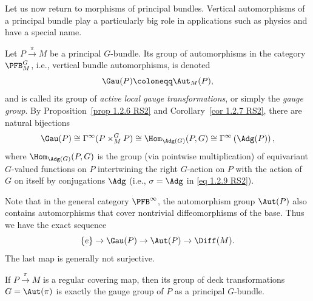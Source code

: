 \PRLsep

Let us now return to morphisms of principal bundles. Vertical automorphisms of a principal bundle play a particularly big role in applications such as physics and have a special name.

\begin{defn}
    Let $P\overset{\pi}{\to}M$ be a principal $G$-bundle. Its group of automorphisms in the category $\PFB^G_M$, i.e., vertical bundle automorphisms, is denoted 
    \[\Gau(P)\coloneqq \Aut_M(P),\]
    and is called its group of \emph{active local gauge transformations}, or simply the \emph{gauge group}. By Proposition~\ref{prop 1.2.6 RS2} and Corollary~\ref{cor 1.2.7 RS2}, there are natural bijections \[\Gau(P)\cong \Gamma^\infty(P\times^G_MP)\cong \Hom_{\Adg(G)}(P,G)\cong \Gamma^\infty\left(\Adg(P)\right),\]
    where $\Hom_{\Adg(G)}(P,G)$ is the group (via pointwise multiplication) of equivariant $G$-valued functions on $P$ intertwining the right $G$-action on $P$ with the action of $G$ on itself by conjugations $\Adg$ (i.e., $\sigma=\Adg$ in \eqref{eq 1.2.9 RS2}).
\end{defn}

Note that in the general category $\PFB^\infty$, the automorphism group $\Aut(P)$ also contains automorphisms that cover nontrivial diffeomorphisms of the base. Thus we have the exact sequence
\[\{e\}\to \Gau(P)\to \Aut(P)\to \Diff(M).\]
The last map is generally not surjective. 

\begin{example}
    If $P\overset{\pi}{\to} M$ is a regular covering map, then its group of deck transformations $G=\Aut(\pi)$ is exactly the gauge group of $P$ as a principal $G$-bundle.
\end{example}


